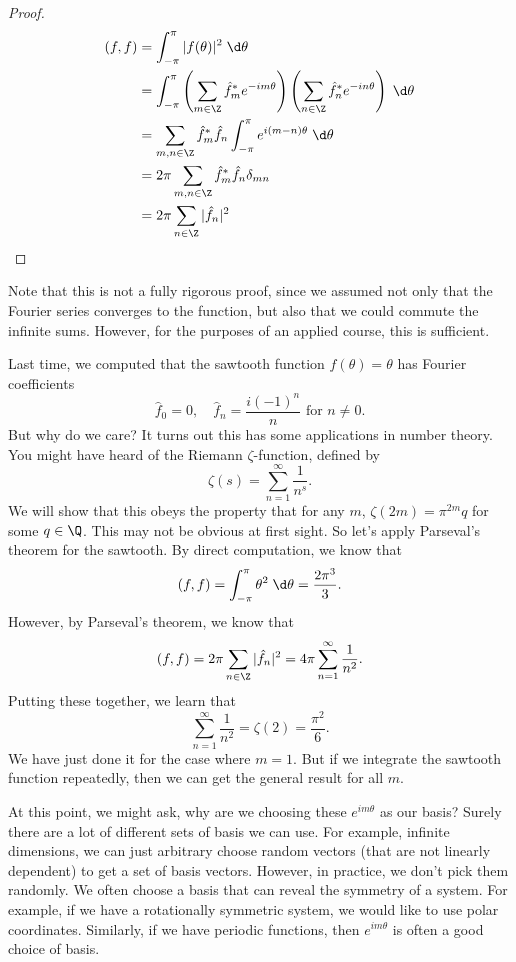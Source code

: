 \documentclass[a4paper]{article}
\begin{document}
\begin{proof}
  \begin{align*}
    (f, f) &= \int_{-\pi}^\pi |f(\theta)|^2 \;\d \theta\\
    &= \int_{-\pi}^{\pi} \left(\sum_{m \in \Z} \hat{f}_m^* e^{-im\theta}\right)\left(\sum_{n \in \Z} \hat{f}_n^* e^{-in\theta}\right)\;\d \theta\\
    &= \sum_{m, n\in \Z}\hat{f}_m^* \hat{f}_n \int_{-\pi}^\pi e^{i(m - n)\theta}\;\d \theta\\
    &= 2\pi \sum_{m, n\in \Z}\hat{f}_m^* \hat{f}_n \delta_{mn}\\
    &= 2\pi \sum_{n\in \Z}|\hat{f}_n|^2
  \end{align*}
\end{proof}
Note that this is not a fully rigorous proof, since we assumed not only that the Fourier series converges to the function, but also that we could commute the infinite sums. However, for the purposes of an applied course, this is sufficient.

Last time, we computed that the sawtooth function $f(\theta) = \theta$ has Fourier coefficients
\[
  \hat{f}_0 = 0,\quad \hat{f}_n = \frac{i(-1)^{n}}{n}\text{ for }n\not= 0.
\]
But why do we care? It turns out this has some applications in number theory. You might have heard of the Riemann $\zeta$-function, defined by
\[
  \zeta(s) = \sum_{n = 1}^\infty \frac{1}{n^s}.
\]
We will show that this obeys the property that for any $m$, $\zeta(2m) = \pi^{2m}q$ for some $q\in \Q$. This may not be obvious at first sight. So let's apply Parseval's theorem for the sawtooth. By direct computation, we know that
\[
  (f, f) = \int_{-\pi}^\pi \theta^2 \;\d \theta = \frac{2\pi^3}{3}.
\]
However, by Parseval's theorem, we know that
\[
  (f, f) = 2\pi \sum_{n \in \Z}|\hat{f}_n|^2 = 4\pi \sum_{n = 1}^\infty \frac{1}{n^2}.
\]
Putting these together, we learn that
\[
  \sum_{n = 1}^\infty \frac{1}{n^2} = \zeta(2) = \frac{\pi^2}{6}.
\]
We have just done it for the case where $m = 1$. But if we integrate the sawtooth function repeatedly, then we can get the general result for all $m$.

At this point, we might ask, why are we choosing these $e^{im\theta}$ as our basis? Surely there are a lot of different sets of basis we can use. For example, infinite dimensions, we can just arbitrary choose random vectors (that are not linearly dependent) to get a set of basis vectors. However, in practice, we don't pick them randomly. We often choose a basis that can reveal the symmetry of a system. For example, if we have a rotationally symmetric system, we would like to use polar coordinates. Similarly, if we have periodic functions, then $e^{im\theta}$ is often a good choice of basis.
\end{document}
